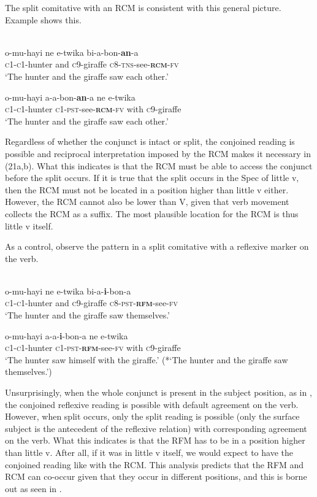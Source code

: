 \documentclass[output=paper]{langsci/langscibook}
\begin{document}
The split comitative with an RCM is consistent with this general picture. Example  shows this.


\ea\label{ex:}
  \\
\ea
\gll  o-mu-hayi   ne   e-twika   bi-a-bon-\textbf{an}-a  \\
       \textsc{c1-c1}-hunter   and   \textsc{c}9-giraffe   \textsc{c8-tns}-see-\textbf{\textsc{rcm}}\textsc{-fv} \\
\glt   ‘The hunter and the giraffe saw each other.’

\ex
\gll   o-mu-hayi     a-a-bon-\textbf{an}-a     ne   e-twika\\
       \textsc{c1-c1}-hunter    \textsc{c1-pst}-see-\textbf{\textsc{rcm}}\textsc{-fv}  with  \textsc{c}9-giraffe   \\
\glt   ‘The hunter and the giraffe saw each other.’
\z
\z

Regardless of whether the conjunct is intact or split, the conjoined reading is possible and reciprocal interpretation imposed by the RCM makes it necessary in (21a,b). What this indicates is that the RCM must be able to access the conjunct before the split occurs. If it is true that the split occurs in the Spec of little v, then the RCM must not be located in a position higher than little v either. However, the RCM cannot also be lower than V, given that verb movement collects the RCM as a suffix. The most plausible location for the RCM is thus little v itself. 

As a control, observe the pattern in a split comitative with a reflexive marker on the verb. 


\ea\label{ex:}
  \\
\ea
\gll  o-mu-hayi   ne   e-twika   bi-a-\textbf{{i}}{-bon-a}  \\
       \textsc{c1-c1}-hunter   and   \textsc{c}9-giraffe   \textsc{c}8-\textsc{pst-}\textbf{\textsc{rfm}}-see-\textsc{fv} \\
\glt   ‘The hunter and the giraffe saw themselves.’

\ex
\gll  o-mu-hayi   a-a-\textbf{i}-bon-a     ne   e-twika \\
       \textsc{c1-c1}-hunter  \textsc{c}1-\textsc{pst-}\textbf{\textsc{rfm}}-see-\textsc{fv}   with   \textsc{c}9-giraffe \\
\glt   ‘The hunter saw himself with the giraffe.’
\glt   (*‘The hunter and the giraffe saw themselves.’)
\z
\z

Unsurprisingly, when the whole conjunct is present in the subject position, as in , the conjoined reflexive reading is possible with default agreement on the verb. However, when split occurs, only the split reading is possible (only the surface subject is the antecedent of the reflexive relation) with corresponding agreement on the verb. What this indicates is that the RFM has to be in a position higher than little v. After all, if it was in little v itself, we would expect  to have the conjoined reading like with the RCM. This analysis predicts that the RFM and RCM can co-occur given that they occur in different positions, and this is borne out as seen in .
\end{document}

